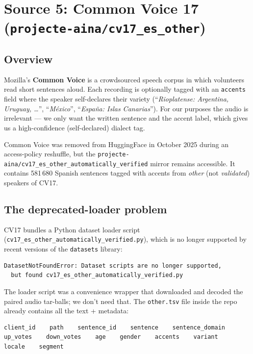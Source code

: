 \documentclass[11pt,a4paper]{article}
\begin{document}
\section{Source 5: Common Voice 17 (\texttt{projecte-aina/cv17\_es\_other})}

\subsection{Overview}

Mozilla's \textbf{Common Voice} is a crowdsourced speech corpus in which
volunteers read short sentences aloud. Each recording is optionally
tagged with an \texttt{accents} field where the speaker self-declares
their variety (``\emph{Rioplatense: Argentina, Uruguay, \ldots}'',
``\emph{México}'', ``\emph{España: Islas Canarias}''). For our purposes
the audio is irrelevant --- we only want the written sentence and the
accent label, which gives us a high-confidence (self-declared) dialect
tag.

Common Voice was removed from HuggingFace in October 2025 during an
access-policy reshuffle, but the
\texttt{projecte-aina/cv17\_es\_other\_automatically\_verified} mirror
remains accessible. It contains 581\,680 Spanish sentences tagged with
accents from \emph{other} (not \emph{validated}) speakers of CV17.

\subsection{The deprecated-loader problem}

CV17 bundles a Python dataset loader script
(\texttt{cv17\_es\_other\_automatically\_verified.py}), which is no
longer supported by recent versions of the \texttt{datasets} library:

\begin{lstlisting}[style=shellcode]
DatasetNotFoundError: Dataset scripts are no longer supported,
  but found cv17_es_other_automatically_verified.py
\end{lstlisting}

The loader script was a convenience wrapper that downloaded and decoded
the paired audio tar-balls; we don't need that. The \texttt{other.tsv}
file inside the repo already contains all the text + metadata:

\begin{lstlisting}[style=shellcode]
client_id    path    sentence_id    sentence    sentence_domain
up_votes    down_votes    age    gender    accents    variant    locale    segment
\end{lstlisting}
\end{document}

